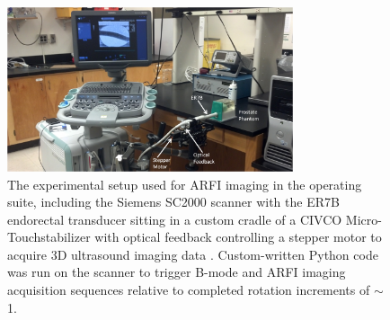\begin{figure}
\centering
\includegraphics[width=0.75\textwidth]{figs/setup_annotated.png}
\caption{The experimental setup used for ARFI imaging in the operating suite,
    including the Siemens SC2000 scanner with the ER7B endorectal transducer
    sitting in a custom cradle of a CIVCO Micro-Touch\texttrademark stabilizer
    with optical feedback controlling a stepper motor to acquire 3D ultrasound
    imaging data \invivo.  Custom-written Python code was run on the scanner to
    trigger B-mode and ARFI imaging acquisition sequences relative to completed
    rotation increments of $\sim$1\degree.}
\label{fig:setup_annotated} 
\end{figure}
